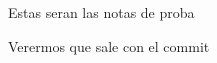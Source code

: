 \documentclass[12pt]{report}
\begin{document}
Estas seran las notas de proba

Verermos que sale con el commit
\end{document}
